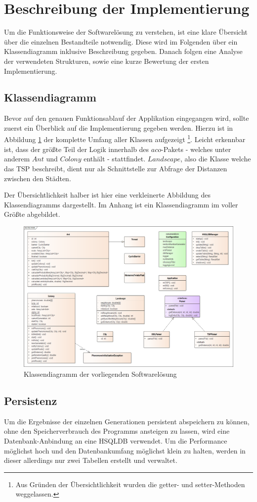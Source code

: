 \section{Beschreibung der Implementierung}
Um die Funktionsweise der Softwarelösung zu verstehen, ist eine klare Übersicht über die einzelnen Bestandteile notwendig. Diese wird im Folgenden über ein Klassendiagramm inklusive Beschreibung gegeben. Danach folgen eine Analyse der verwendeten Strukturen, sowie eine kurze Bewertung der ersten Implementierung.

\subsection{Klassendiagramm}
Bevor auf den genauen Funktionsablauf der Applikation eingegangen wird, sollte zuerst ein Überblick auf die Implementierung gegeben werden. Hierzu ist in Abbildung \ref{classDiagram} der komplette Umfang aller Klassen aufgezeigt
\footnote{Aus Gründen der Übersichtlichkeit wurden die getter- und setter-Methoden weggelassen.}. Leicht erkennbar ist, dass der größte Teil der Logik innerhalb des $aco$-Pakets - welches unter anderem $Ant$ und $Colony$ enthält - stattfindet. $Landscape$, also die Klasse welche das \ac{TSP} beschreibt, dient nur als Schnittstelle zur Abfrage der Distanzen zwischen den Städten.

Der Übersichtlichkeit halber ist hier eine verkleinerte Abbildung des Klassendiagramms dargestellt. Im Anhang ist ein Klassendiagramm im voller Größte abgebildet.

\begin{figure}[h!]
	\centering
	\includegraphics[width=0.7\linewidth]{../../../01_uml/classModel.png}
	\caption{Klassendiagramm der vorliegenden Softwarelösung}
	\label{classDiagram}
\end{figure}

\subsection{Persistenz}
Um die Ergebnisse der einzelnen Generationen persistent abspeichern zu können, ohne den Speicherverbrauch des Programms ansteigen zu lassen, wird eine Datenbank-Anbindung an eine \ac{HSQLDB} verwendet. Um die Performance möglichst hoch und den Datenbankumfang möglichst klein zu halten, werden in dieser allerdings nur zwei Tabellen erstellt und verwaltet.

